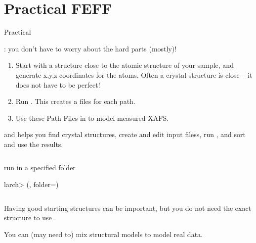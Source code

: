 \section{Practical FEFF}

\begin{slide}{ Practical {\feff} }

    \begin{cenpage}{110mm}

{}: you don't have to worry about the hard parts (mostly)!

\begin{enumerate}
\item Start with a structure close to the {} atomic structure
  of your sample, and generate x,y,z coordinates for the atoms. Often a
  crystal structure is close -- it does not have to be perfect!

\item Run {\feff}.  This creates a {\feffndat} files for each path.

\item Use these  Path Files in to model measured XAFS.
\end{enumerate}

  {\larch} and {\xasviewer} helps you find crystal structures, create and
  edit input filess, run {\feff}, and sort and use the results. 

\begin{columns}
      \begin{column}[T]{88mm}
        \begin{block}{ run {\feff} in a specified folder  }
          \begin{semiverbatim} {\footnotesize larch>
{}({}, folder={}) }
          \end{semiverbatim}
        \end{block}

      \end{column}
      \begin{column}[T]{1mm} \end{column}
    \end{columns}


\end{cenpage}

  Having good starting structures can be important, but you do not need the
  exact structure to use {\feff}.

\vmm


  You can (may need to) mix structural models to model real data.


\end{slide}
